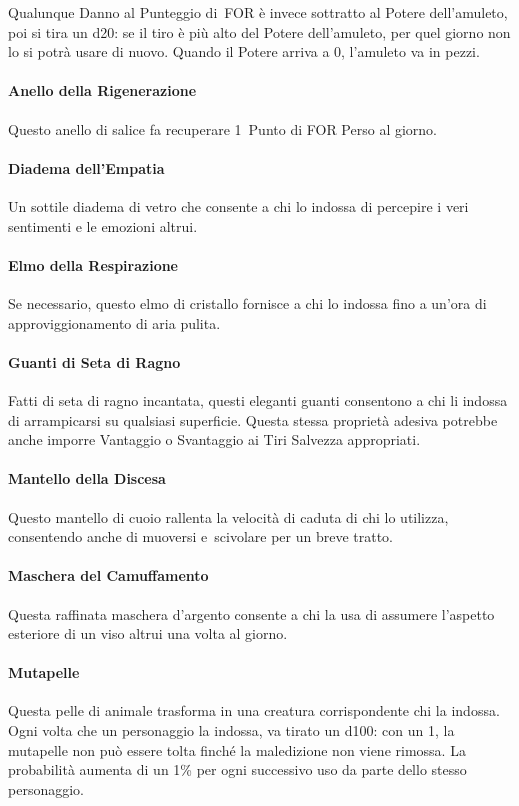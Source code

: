 \documentclass[itdr]{subfiles}
\begin{document}
Qualunque Danno al Punteggio di~FOR è invece sottratto al Potere dell'amuleto, poi si tira un d20: se il tiro è più alto del Potere dell'amuleto, per quel giorno non lo si potrà usare di nuovo. Quando il Potere arriva a 0, l'amuleto va in pezzi.

\vfill
\paragraph{Anello della Rigenerazione}
Questo anello di salice fa recuperare 1~Punto di FOR Perso al giorno.

\vfill
\paragraph{Diadema dell'Empatia}
Un sottile diadema di vetro che consente a chi lo indossa di percepire i veri sentimenti e le emozioni altrui.

\vfill
\paragraph{Elmo della Respirazione}
Se necessario, questo elmo di cristallo fornisce a chi lo indossa fino a un'ora di approviggionamento di aria pulita.

\vfill
\paragraph{Guanti di Seta di Ragno}
Fatti di seta di ragno incantata, questi eleganti guanti consentono a chi li indossa di arrampicarsi su qualsiasi superficie. Questa stessa proprietà adesiva potrebbe anche imporre Vantaggio o Svantaggio ai Tiri Salvezza appropriati.

\vfill
\paragraph{Mantello della Discesa}
Questo mantello di cuoio rallenta la velocità di caduta di chi lo utilizza, consentendo anche di muoversi e~scivolare per un breve tratto.

\vfill
\paragraph{Maschera del Camuffamento}
Questa raffinata maschera d'argento consente a chi la usa di assumere l'aspetto esteriore di un \mbox{viso} altrui una volta al giorno.

\vfill
\paragraph{Mutapelle}
Questa pelle di animale trasforma in una creatura corrispondente chi la indossa. Ogni volta che un personaggio la indossa, va tirato un d100: con un 1, la mutapelle non può essere tolta finché la maledizione non viene rimossa. La probabilità aumenta di un 1\% per ogni successivo uso da parte dello stesso personaggio.
\end{document}
